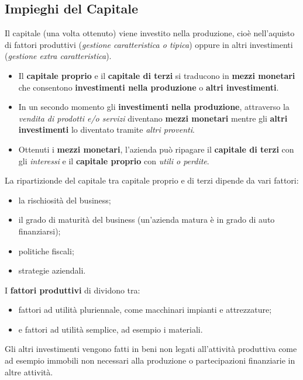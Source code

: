 \documentclass[a4paper,portrait,12pt]{article}
\theoremstyle{definition}
\begin{document}
\subsection{Impieghi del Capitale}

Il capitale (una volta ottenuto) viene investito nella produzione, cioè nell'aquisto di fattori produttivi (\emph{gestione caratteristica o tipica}) oppure in altri investimenti (\emph{gestione extra caratteristica}).\\

\begin{itemize}
\item Il \textbf{capitale proprio} e il \textbf{capitale di terzi} si traducono in \textbf{mezzi monetari} che consentono \textbf{investimenti nella produzione} o \textbf{altri investimenti}.
\item In un secondo momento gli \textbf{investimenti nella produzione}, attraverso la \emph{vendita di prodotti e/o servizi} diventano \textbf{mezzi monetari} mentre gli \textbf{altri investimenti} lo diventato tramite \emph{altri proventi}.
\item Ottenuti i \textbf{mezzi monetari}, l'azienda può ripagare il \textbf{capitale di terzi} con gli \emph{interessi} e il \textbf{capitale proprio} con \emph{utili o perdite}. 
\end{itemize}

La ripartizionde del capitale tra capitale proprio e di terzi dipende da vari fattori:
\begin{itemize}
\item la rischiosità del business;
\item il grado di maturità del business (un'azienda matura è in grado di auto finanziarsi);
\item politiche fiscali;
\item strategie aziendali.
\end{itemize}

I \textbf{fattori produttivi} di dividono tra:
\begin{itemize}
\item fattori ad utilità pluriennale, come macchinari impianti e attrezzature;
\item e fattori ad utilità semplice, ad esempio i materiali.
\end{itemize}

Gli altri investimenti vengono fatti in beni non legati all'attività produttiva come ad esempio immobili non necessari alla produzione o partecipazioni finanziarie in altre attività.\\
\end{document}
